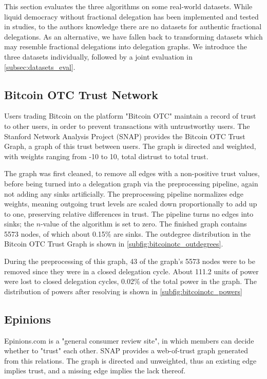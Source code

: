 This section evaluates the three algorithms on some real-world datasets. While liquid democracy without fractional delegation has been implemented and tested in studies, to the authors knowledge there are no datasets for authentic fractional delegations. As an alternative, we have fallen back to transforming datasets which may resemble fractional delegations into delegation graphs. We  introduce the three datasets individually, followed by a joint evaluation in \cref{subsec:datasets_eval}.

\subsection{Bitcoin OTC Trust Network}

Users trading Bitcoin on the platform "Bitcoin OTC" maintain a record of trust to other users, in order to prevent transactions with untrustworthy users. The Stanford Network Analysis Project (SNAP) provides the Bitcoin OTC Trust Graph, a graph of this trust between users. \cite{kumar2016edge, kumar2018rev2} The graph is directed and weighted, with weights ranging from -10 to 10, total distrust to total trust. 

The graph was first cleaned, to remove all edges with a non-positive trust values, before being turned into a delegation graph via the preprocessing pipeline, again not adding any sinks artificially. The preprocessing pipeline normalizes edge weights, meaning outgoing trust levels are scaled down proportionally to add up to one, preserving relative differences in trust. The pipeline turns no edges into sinks; the $n$-value of the algorithm is set to zero. The finished graph contains 5573 nodes, of which about 0.15\% are sinks. The outdegree distribution in the Bitcoin OTC Trust Graph is shown in \cref{subfig:bitcoinotc_outdegrees}.

During the preprocessing of this graph, 43 of the graph's 5573 nodes were to be removed since they were in a closed delegation cycle. About 111.2 units of power were lost to closed delegation cycles,  0.02\% of the total power in the graph. The distribution of powers after resolving is shown in \cref{subfig:bitcoinotc_powers}

\subsection{Epinions}

Epinions.com is a "general consumer review site", in which members can decide whether to "trust" each other. SNAP provides a web-of-trust graph generated from this relations. \cite{richardsonTrustManagementSemantic2003} The graph is directed and unweighted, thus an existing edge implies trust, and a missing edge implies the lack thereof.

